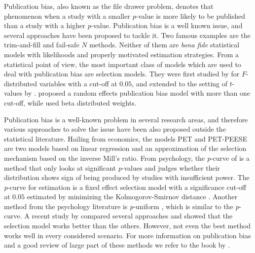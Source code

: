\documentclass[useAMS,usenatbib,referee]{biom}
\begin{document}
Publication bias, also known as the file drawer problem, \citep[see, e.g.,][]{iyengar1988selection} denotes that phenomenon when a study with a smaller \textit{p}-value is more likely to be published than a study with a higher \textit{p}-value. Publication bias is a well known issue, and several approaches have been proposed to tackle it. Two famous examples are the trim-and-fill \citep{duval2000trim} and fail-safe $N$ \citep{becker2005failsafe} methods. Neither of them are \textit{bona fide} statistical models with likelihoods and properly motivated estimation strategies. From a statistical point of view, the most important class of models which are used to deal with publication bias are selection models. They were first studied by \citet{hedges1984estimation} for $F$-distributed variables with a cut-off at $0.05$, and extended to the setting of $t$-values by \citet{iyengar1988selection}. \citet{hedges1992modeling} proposed a random effects publication bias model with more than one cut-off, while \citet{citkowicz2017parsimonious} used beta distributed weights.

Publication bias is a well-known problem in several research areas, and therefore various approaches to solve the issue have been also proposed outside the statistical literature. Hailing from economics, the models PET and PET-PEESE \citep{stanley2014meta,stanley2017limitations} are two models based on linear regression and an approximation of the selection mechanism based on the inverse Mill's ratio. From psychology, the \textit{p}-curve of \citet{simonsohn2014p} is a method that only looks at significant \textit{p}-values and judges whether their distribution shows sign of being produced by studies with insufficient power. The \textit{p}-curve for estimation \citep{simonsohn2014} is a fixed effect selection model with a significance cut-off at $0.05$ estimated by minimizing the Kolmogorov-Smirnov distance \citep{mcshane2016adjusting}. Another method from the psychology literature is \textit{p}-uniform \citep{van2015meta}, which is similar to the \textit{p}-curve. A recent study by \citet{carter2019correcting} compared several approaches and showed that the selection model works better than the others. However, not even the best method works well in every considered scenario. For more information on publication bias and a good review of large part of these methods we refer to the book by \citet{rothstein2006publication}.
\end{document}

